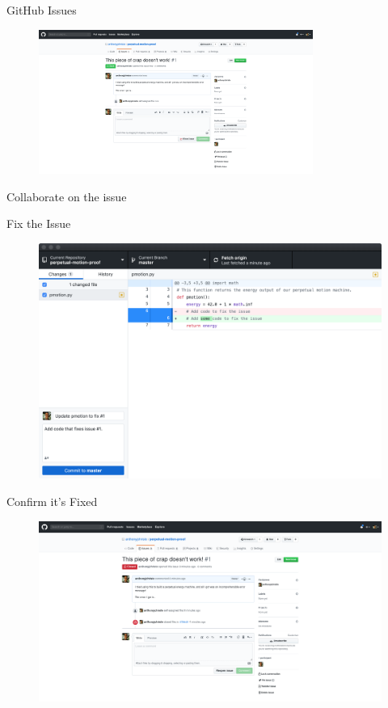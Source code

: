 \documentclass{beamer}
\begin{document}
    \begin{frame}{GitHub Issues}
        \begin{figure}
            \centering
            \includegraphics[width=0.8\textwidth]{figures/issues_3.png}
        \end{figure}
        \centering
        Collaborate on the issue
    \end{frame}

    \begin{frame}{Fix the Issue}
        \begin{figure}
            \centering
            \includegraphics[width=\textwidth]{figures/issues_4.png}
        \end{figure}
    \end{frame}

    \begin{frame}{Confirm it's Fixed}
        \begin{figure}
            \centering
            \includegraphics[width=\textwidth]{figures/issues_5.png}
        \end{figure}
    \end{frame}
\end{document}
